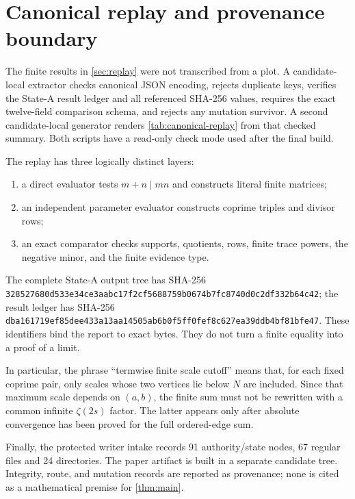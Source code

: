 \section{Canonical replay and provenance boundary}
\label{app:canonical-replay}

The finite results in \cref{sec:replay} were not transcribed from a plot.
A candidate-local extractor checks canonical JSON encoding, rejects
duplicate keys, verifies the State-A result ledger and all referenced
SHA-256 values, requires the exact twelve-field comparison schema, and
rejects any mutation survivor.  A second candidate-local generator renders
\cref{tab:canonical-replay} from that checked summary.  Both scripts have a
read-only check mode used after the final build.

The replay has three logically distinct layers:
\begin{enumerate}
  \item a direct evaluator tests $m+n\mid mn$ and constructs literal finite
  matrices;
  \item an independent parameter evaluator constructs coprime triples and
  divisor rows;
  \item an exact comparator checks supports, quotients, rows, finite trace
  powers, the negative minor, and the finite evidence type.
\end{enumerate}
The complete State-A output tree has SHA-256
\texttt{32852768\allowbreak{}0d533e34\allowbreak{}ce3aabc1\allowbreak{}7f2cf568\allowbreak{}8759b067\allowbreak{}4b7fc874\allowbreak{}0d0c2df3\allowbreak{}32b64c42};
the result ledger has SHA-256
\texttt{dba16171\allowbreak{}9ef85dee\allowbreak{}433a13aa\allowbreak{}14505ab6\allowbreak{}b0f5ff0f\allowbreak{}ef8c627e\allowbreak{}a39ddb4b\allowbreak{}f81bfe47}.
These identifiers bind the report to exact bytes.  They do not turn a
finite equality into a proof of a limit.

In particular, the phrase ``termwise finite scale cutoff'' means that, for
each fixed coprime pair, only scales whose two vertices lie below $N$ are
included.  Since that maximum scale depends on $(a,b)$, the finite sum must
not be rewritten with a common infinite $\zeta(2s)$ factor.  The latter
appears only after absolute convergence has been proved for the full
ordered-edge sum.

Finally, the protected writer intake records 91 authority/state nodes, 67
regular files and 24 directories.  The paper artifact is built in a
separate candidate tree.  Integrity, route, and mutation records are
reported as provenance; none is cited as a mathematical premise for
\cref{thm:main}.
